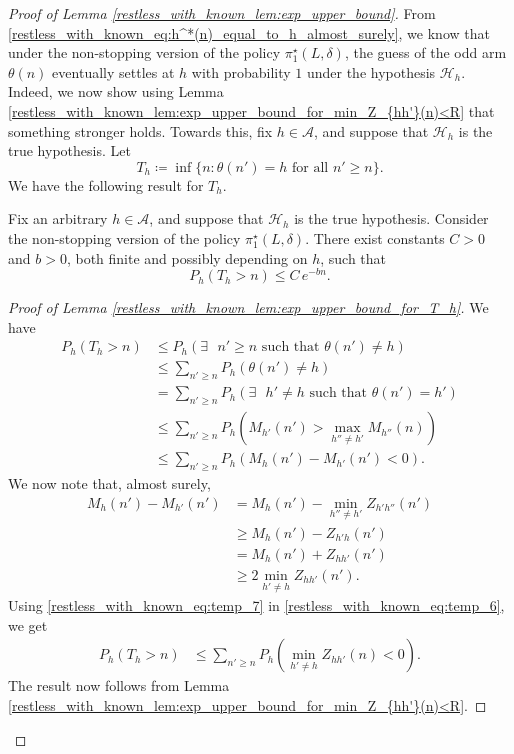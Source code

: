 \begin{proof}[Proof of Lemma \ref{restless_with_known_lem:exp_upper_bound}]
From \eqref{restless_with_known_eq:h^*(n)_equal_to_h_almost_surely}, we know that under the non-stopping version of the policy $\pi_1^\star(L,\delta)$, the guess of the odd arm $\theta(n)$ eventually settles at $h$ with probability $1$ under the hypothesis $\mathcal{H}_h$. Indeed, we now show using Lemma \ref{restless_with_known_lem:exp_upper_bound_for_min_Z_{hh'}(n)<R} that something stronger holds. Towards this, fix $h\in\mathcal{A}$, and suppose that $\mathcal{H}_h$ is the true hypothesis. Let
\begin{equation}
	T_h\coloneqq \inf\{n:\theta(n')=h\text{ for all }n'\geq n\}.\label{restless_with_known_eq:T_h}
\end{equation}
We have the following result for $T_h$.
\begin{lemma}\label{restless_with_known_lem:exp_upper_bound_for_T_h}
	Fix an arbitrary $h\in\mathcal{A}$, and suppose that $\mathcal{H}_h$ is the true hypothesis. Consider the non-stopping version of the policy $\pi_1^\star(L,\delta)$. There exist constants $C>0$ and $b>0$, both finite and possibly depending on $h$, such that
	\begin{equation}
		P_h\left(T_h>n\right)\leq C\,e^{-bn}.
	\end{equation}
\end{lemma}
\begin{proof}[Proof of Lemma \ref{restless_with_known_lem:exp_upper_bound_for_T_h}]
	We have
	\begingroup\allowdisplaybreaks\begin{align}
		P_h\left(T_h>n\right)&\leq P_h\left(\exists\text{ }n'\geq n\text{ such that }\theta(n')\neq h\right)\nonumber\\
		&\leq \sum\limits_{n'\geq n}P_h(\theta(n')\neq h)\nonumber\\
		&= \sum\limits_{n'\geq n}P_h\left(\exists\text{ }h'\neq h\text{ such that }\theta(n')=h'\right)\nonumber\\
		&\leq \sum\limits_{n'\geq n}P_h\left(M_{h'}(n')> \max\limits_{h''\neq h'}M_{h''}(n)\right)\nonumber\\
		&\leq \sum\limits_{n'\geq n}P_h\left(M_{h}(n')-M_{h'}(n')< 0\right).\label{restless_with_known_eq:temp_6}
	\end{align}\endgroup
	We now note that, almost surely,
	\begingroup\allowdisplaybreaks\begin{align}
		M_h(n')-M_{h'}(n')&=M_h(n')-\min\limits_{h''\neq h'}Z_{h'h''}(n')\nonumber\\
		&\geq M_{h}(n')-Z_{h'h}(n')\nonumber\\
		&=M_{h}(n')+Z_{hh'}(n')\nonumber\\
		&\geq 2\min\limits_{h'\neq h}Z_{hh'}(n').\label{restless_with_known_eq:temp_7}
	\end{align}\endgroup
	Using \eqref{restless_with_known_eq:temp_7} in \eqref{restless_with_known_eq:temp_6}, we get
	\begin{align}
		P_h\left(T_h>n\right)&\leq \sum\limits_{n'\geq n}P_h\left(\min\limits_{h'\neq h}Z_{hh'}(n)< 0\right).
	\end{align}
	The result now follows from Lemma \ref{restless_with_known_lem:exp_upper_bound_for_min_Z_{hh'}(n)<R}.
\end{proof}


\end{proof}
